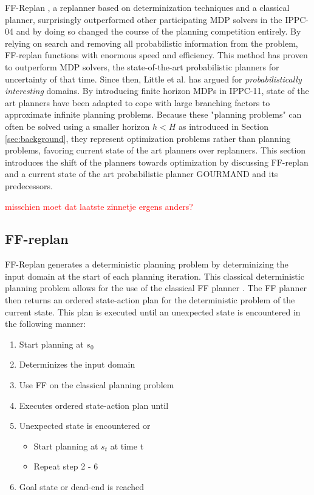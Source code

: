 \documentclass[runningheads,a4paper]{llncs}
\newcommand\myworries[1]{\textcolor{red}{#1}}
\begin{document}
FF-Replan \cite{FFReplan}, a replanner based on determinization techniques and a classical planner, surprisingly outperformed other participating MDP solvers in the IPPC-04 and by doing so changed the course of the planning competition entirely. By relying on search and removing all probabilistic information from the problem, FF-replan functions with enormous speed and efficiency. This method has proven to outperform MDP solvers, the state-of-the-art probabilistic planners for uncertainty of that time. Since then, Little et al. has argued for \emph{probabilistically interesting} domains. By introducing finite horizon MDPs in IPPC-11, state of the art planners have been adapted to cope with large branching factors to approximate infinite planning problems. Because these "planning problems" can often be solved using a smaller horizon $h < H$ as introduced in Section \ref{sec:background}, they represent optimization problems rather than planning problems, favoring current state of the art planners over replanners. This section introduces the shift of the planners towards optimization  by discussing FF-replan and a current state of the art probabilistic planner \textsc{GOURMAND} and its predecessors.

\myworries{misschien moet dat laatste zinnetje ergens anders?}

\subsection{FF-replan}
\label{sec:ffreplan}
 FF-Replan generates a deterministic planning problem by determinizing the input domain at the start of each planning iteration. This classical deterministic planning problem allows for the use of the classical FF planner \cite{Hoffmann01theff}. The FF planner then returns an ordered state-action plan for the deterministic problem of the current state. This plan is executed until an unexpected state is encountered in the following manner:

\begin{enumerate}
	\item Start planning at $s_0$
	\item Determinizes the input domain
	\item Use FF on the classical planning problem
	\item Executes ordered state-action plan until
	\item Unexpected state is encountered or
	\begin{itemize}
		\item Start planning at $s_t$ at time t
		\item Repeat step 2 - 6
	\end{itemize}
	\item Goal state or dead-end is reached
\end{enumerate}
\end{document}
